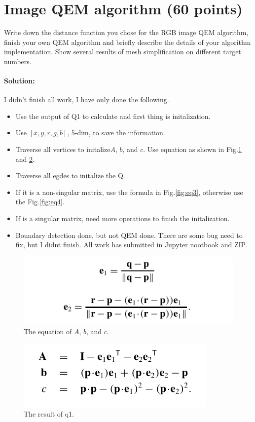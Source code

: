 \documentclass[]{article}
\begin{document}
\newpage
\section{Image QEM algorithm (60 points)}
Write down the distance function you chose for the RGB image QEM algorithm, finish your own QEM algorithm and briefly describe the details of your algorithm implementation. Show several results of mesh simplification on different target numbers.
\paragraph{\color{red}Solution:}
I didn't finish all work, I have only done the following.
\begin{itemize}
    \item[(1)] Use the output of Q1 to calculate and first thing is initalization.
    \item[(2)] Use $[x,y,r,g,b]$, 5-dim, to save the information.
    \item[(3)] Traverse all vertices to initalize$A$, $b$, and $c$. Use equation as shown in Fig.\ref{fig:eq1} and \ref{fig:eq2}.
    \item[(4)] Traverse all egdes to initalize the Q. 
    \item[(5)] If it is a non-singular matrix, use the formula in Fig.\ref{fig:eq3}, otherwise use the Fig.\ref{fig:eq4}.
    \item[(6)] If is a singular matrix, need more operations to finish the initalization.
    \item[(7)] Boundary detection done, but not QEM done. There are some bug need to fix, but I didnt finish. All work has submitted in Jupyter nootbook and ZIP.
\end{itemize}
\begin{figure}[ht]
    \centering 
    \includegraphics[width=1\columnwidth]{eq1.png} 
    \caption{The equation of $A$, $b$, and $c$.}
    \label{fig:eq1} 
\end{figure}

\begin{figure}[ht]
    \centering 
    \includegraphics[width=0.8\columnwidth]{eq2.png} 
    \caption{The result of q1.}
    \label{fig:eq2} 
\end{figure}
\end{document}
